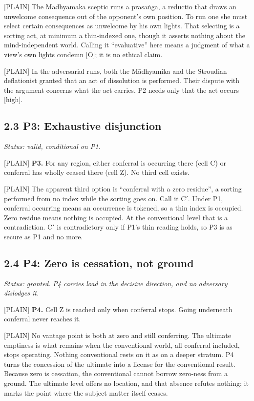 \documentclass[11pt]{article}
\newcommand{\register}[1]{{\ttfamily\small #1}}
\begin{document}
\register{[PLAIN]} The Madhyamaka sceptic runs a prasaṅga, a reductio that draws an unwelcome consequence out of the opponent's own position. To run one she must select certain consequences as unwelcome by his own lights. That selecting is a sorting act, at minimum a thin-indexed one, though it asserts nothing about the mind-independent world. Calling it ``evaluative'' here means a judgment of what a view's own lights condemn [O]; it is no ethical claim.

\register{[PLAIN]} In the adversarial runs, both the Mādhyamika and the Stroudian deflationist granted that an act of dissolution is performed. Their dispute with the argument concerns what the act carries. P2 needs only that the act occurs [high].

\subsection*{2.3 P3: Exhaustive disjunction}

\emph{Status: valid, conditional on P1.}

\register{[PLAIN]} \textbf{P3.} For any region, either conferral is occurring there (cell C) or conferral has wholly ceased there (cell Z). No third cell exists.

\register{[PLAIN]} The apparent third option is ``conferral with a zero residue'', a sorting performed from no index while the sorting goes on. Call it C\ensuremath{'}. Under P1, conferral occurring means an occurrence is tokened, so a thin index is occupied. Zero residue means nothing is occupied. At the conventional level that is a contradiction. C\ensuremath{'} is contradictory only if P1's thin reading holds, so P3 is as secure as P1 and no more.

\subsection*{2.4 P4: Zero is cessation, not ground}

\emph{Status: granted. P4 carries load in the decisive direction, and no adversary dislodges it.}

\register{[PLAIN]} \textbf{P4.} Cell Z is reached only when conferral stops. Going underneath conferral never reaches it.

\register{[PLAIN]} No vantage point is both at zero and still conferring. The ultimate emptiness is what remains when the conventional world, all conferral included, stops operating. Nothing conventional rests on it as on a deeper stratum. P4 turns the concession of the ultimate into a license for the conventional result. Because zero is cessation, the conventional cannot borrow zero-ness from a ground. The ultimate level offers no location, and that absence refutes nothing; it marks the point where the subject matter itself ceases.
\end{document}
